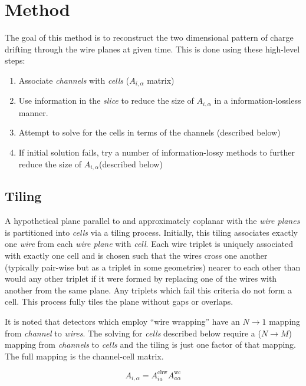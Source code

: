 \documentclass[letter]{article}
\def\mAchc{A_{i,\alpha}}
\def\Achc{$\mAchc$\xspace}
\def\mAchw{A^{\mathrm{chw}}_{ia}}
\def\mAwc{A^{\mathrm{wc}}_{a\alpha}}
\begin{document}
\section{Method}

The goal of this method is to reconstruct the two dimensional pattern
of charge drifting through the wire planes at given time.
This is done using these high-level steps:

\begin{enumerate}
\item Associate \textit{channels} with \textit{cells} (\Achc matrix)
\item Use information in the \textit{slice} to reduce the size of
  \Achc in a information-lossless manner.
\item Attempt to solve for the cells in terms of the channels (described below)
\item If initial solution fails, try a number of information-lossy
  methods to further reduce the size of \Achc (described below)
\end{enumerate}

\subsection{Tiling}

A hypothetical plane parallel to and approximately coplanar with the
\textit{wire planes} is partitioned into \textit{cells} via a tiling
process.
Initially, this tiling associates exactly one \textit{wire} from each
\textit{wire plane} with \textit{cell}.
Each wire triplet is uniquely associated with exactly one cell and is
chosen such that the wires cross one another (typically pair-wise but
as a triplet in some geometries) nearer to each other than would any
other triplet if it were formed by replacing one of the wires with
another from the same plane.
Any triplets which fail this criteria do not form a cell.
This process fully tiles the plane without gaps or overlaps.

It is noted that detectors which employ ``wire wrapping'' have an $N
\to 1$ mapping from \textit{channel} to \textit{wires}.
The solving for \textit{cells} described below require a ($N \to M$)
mapping from \textit{channels} to \textit{cells} and the tiling is
just one factor of that mapping.
The full mapping is the channel-cell matrix.

\begin{equation}
  \label{eq:Achc}
  \mAchc = \mAchw \mAwc
\end{equation}
\end{document}
